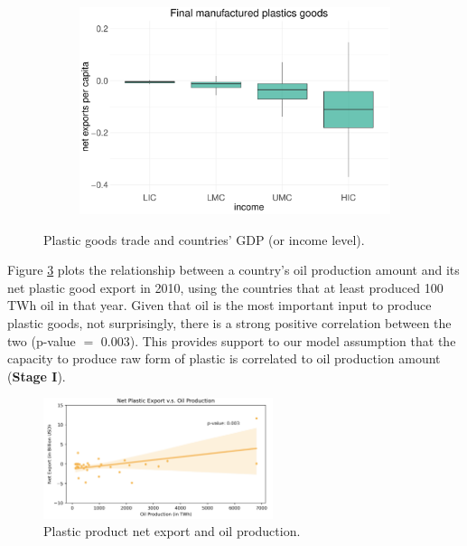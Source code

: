 \documentclass[dvipsnames]{article}
\begin{document}
\begin{figure}[htb!]
\begin{subfigure}{0.345\textwidth}
		\includegraphics[width=\textwidth]{figures/boxplot_final.pdf}
		\label{subfig:final}
	\end{subfigure}
	\caption{\small Plastic goods trade and countries' GDP (or income level).}
	\label{fig:plastic_vs_gdp}
\end{figure}

Figure \ref{fig:oil} plots the relationship between a country's oil production amount and its net plastic good export in 2010, using the countries that at least produced 100 TWh oil in that year. Given that oil is the most important input to produce plastic goods, not surprisingly, there is a strong positive correlation between the two (p-value $=$ 0.003). This provides support to our model assumption that the capacity to produce raw form of plastic is correlated to oil production amount (\textbf{Stage I}).

\begin{figure}[htb!] 
	\centering
		\includegraphics[width=0.6\textwidth]{figures/oil.png}
	\caption{\small Plastic product net export and oil production.}
	\label{fig:oil}
\end{figure}
\end{document}
